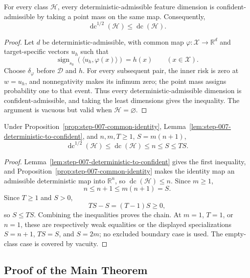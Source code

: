 \begin{lemma}
\label{lem:step-007-deterministic-to-confident}
For every class $\mathcal H$, every deterministic-admissible feature
dimension is confident-admissible by taking a point mass on the same map.
Consequently,
\[
\operatorname{dc}^{1/2}(\mathcal H)\leq\operatorname{dc}(\mathcal H).
\]
\end{lemma}

\begin{proof}
Let $d$ be deterministic-admissible, with common map
$\varphi:\mathcal X\to\mathbb R^d$ and target-specific vectors $u_h$ such
that
\[
\operatorname{sign}_{s_0}(\langle u_h,\varphi(x)\rangle)=h(x)
\qquad(x\in\mathcal X).
\]
Choose $\delta_\varphi$ before $\mathcal D$ and $h$.  For every subsequent
pair, the inner risk is zero at $w=u_h$, and nonnegativity makes its infimum
zero; the point mass assigns probability one to that event.  Thus every
deterministic-admissible dimension is confident-admissible, and taking the
least dimensions gives the inequality.  The argument is vacuous but valid
when $\mathcal H=\varnothing$.
\end{proof}

\begin{proposition}
\label{prop:step-007-dimension-chain}
Under Proposition~\ref{prop:step-007-common-identity},
Lemma~\ref{lem:step-007-deterministic-to-confident}, and
$n,m,T\geq1$, $S=m(n+1)$,
\[
\operatorname{dc}^{1/2}(\mathcal H)
\leq\operatorname{dc}(\mathcal H)\leq n\leq S\leq TS.
\]
\end{proposition}

\begin{proof}
Lemma~\ref{lem:step-007-deterministic-to-confident} gives the first
inequality, and Proposition~\ref{prop:step-007-common-identity} makes the
identity map an admissible deterministic map into $\mathbb R^n$, so
$\operatorname{dc}(\mathcal H)\leq n$.  Since $m\geq1$,
\[
n\leq n+1\leq m(n+1)=S.
\]
Since $T\geq1$ and $S>0$,
\[
TS-S=(T-1)S\geq0,
\]
so $S\leq TS$.  Combining the inequalities proves the chain.  At $m=1$,
$T=1$, or $n=1$, these are respectively weak equalities or the displayed
specializations $S=n+1$, $TS=S$, and $S=2m$; no excluded boundary case is
used.  The empty-class case is covered by vacuity.
\end{proof}

\subsection{Proof of the Main Theorem}
\label{app:main-proof}

